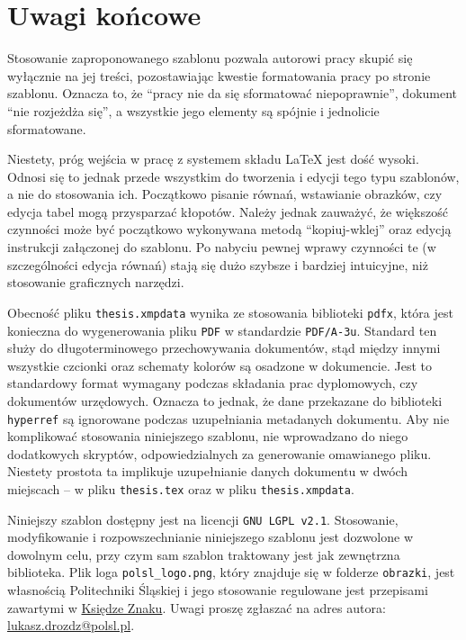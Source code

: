 \chapter{Uwagi końcowe}

Stosowanie zaproponowanego szablonu pozwala autorowi pracy skupić się wyłącznie na jej treści, pozostawiając kwestie formatowania pracy po stronie szablonu. Oznacza to, że \enquote{pracy nie da się sformatować niepoprawnie}, dokument \enquote{nie rozjeżdża się}, a wszystkie jego elementy są spójnie i jednolicie sformatowane.

Niestety, próg wejścia w pracę z systemem składu \LaTeX{} jest dość wysoki. Odnosi się to jednak przede wszystkim do tworzenia i edycji tego typu szablonów, a nie do stosowania ich. Początkowo pisanie równań, wstawianie obrazków, czy edycja tabel mogą przysparzać kłopotów. Należy jednak zauważyć, że większość czynności może być początkowo wykonywana metodą \enquote{kopiuj-wklej} oraz edycją instrukcji załączonej do szablonu. Po nabyciu pewnej wprawy czynności te (w szczególności edycja równań) stają się dużo szybsze i bardziej intuicyjne, niż stosowanie graficznych narzędzi.

Obecność pliku \texttt{thesis.xmpdata} wynika ze stosowania biblioteki \texttt{pdfx}, która jest konieczna do wygenerowania pliku \texttt{PDF} w standardzie \texttt{PDF/A-3u}. Standard ten służy do długoterminowego przechowywania dokumentów, stąd między innymi wszystkie czcionki oraz schematy kolorów są osadzone w dokumencie. Jest to standardowy format wymagany podczas składania prac dyplomowych, czy dokumentów urzędowych. Oznacza to jednak, że dane przekazane do biblioteki \texttt{hyperref} są ignorowane podczas uzupełniania metadanych dokumentu. Aby nie komplikować stosowania niniejszego szablonu, nie wprowadzano do niego dodatkowych skryptów, odpowiedzialnych za generowanie omawianego pliku. Niestety prostota ta implikuje uzupełnianie danych dokumentu w dwóch miejscach -- w pliku \texttt{thesis.tex} oraz w pliku \texttt{thesis.xmpdata}.

Niniejszy szablon dostępny jest na licencji \texttt{GNU LGPL v2.1}. Stosowanie, modyfikowanie i rozpowszechnianie niniejszego szablonu jest dozwolone w dowolnym celu, przy czym sam szablon traktowany jest jak zewnętrzna biblioteka. Plik loga \verb|polsl_logo.png|, który znajduje się w folderze \texttt{obrazki}, jest własnością Politechniki Śląskiej i jego stosowanie regulowane jest przepisami zawartymi w \href{https://www.polsl.pl/siwps/logo-2/}{Księdze Znaku}. Uwagi proszę zgłaszać na adres autora: \href{mailto:lukasz.drozdz@polsl.pl}{lukasz.drozdz@polsl.pl}.
